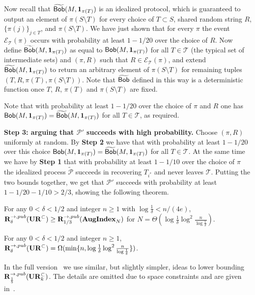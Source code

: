 Now recall that $\widetilde{\mathsf{Bob}}(M, \mathbf{1}_{\pi(T)})$ is an idealized protocol, which is guaranteed to output an element of $\pi(S\setminus T)$ for every choice of  $T\subset S$, shared random string $R$, $\{\pi(j)\}_{j\in T}$, and $\pi(S\setminus T)$. We have just shown that for every $\pi$ the event ${\mathcal E_{\mathcal T}(\pi)}$ occurs  with probability at least $1-1/20$ over the choice of $R$. Now define $\widetilde{\mathsf{Bob}}(M, \mathbf{1}_{\pi(T)})$ as equal to $\mathsf{Bob}(M, \mathbf{1}_{\pi(T)})$ for all $T\in \mathcal{T}$ (the typical set of intermediate sets) and $(\pi, R)$ such that $R\in {\mathcal E_{\mathcal T}(\pi)}$, and extend $\widetilde{\mathsf{Bob}}(M, \mathbf{1}_{\pi(T)})$ to return an arbitrary element of $\pi(S\setminus T)$ for remaining tuples $(T, R, \pi(T),  \pi(S\setminus T))$. Note that $\widetilde{\mathsf{Bob}}$ defined in this way is a deterministic function once $T$, $R$, $\pi(T)$ and $\pi(S\setminus T)$ are fixed. 

Note that with probability at least $1-1/20$ over the choice of $\pi$ and $R$ one has $\mathsf{Bob}(M, \mathbf{1}_{\pi(T)})=\widetilde{\mathsf{Bob}}(M, \mathbf{1}_{\pi(T)})$ for all $T\in \mathcal{T}$, as required.


{\bf Step 3: arguing that $\mathcal{P}'$ succeeds with high probability.}  Choose $(\pi, R)$ uniformly at random. By {\bf Step 2} we have that with probability at least $1-1/20$ over this choice 
$\mathsf{Bob}(M, \mathbf{1}_{\pi(T)})=\widetilde{\mathsf{Bob}}(M, \mathbf{1}_{\pi(T)})$ for all $T\in \mathcal{T}$. At the same time we have by {\bf Step 1} that with probability at least $1-1/10$ over the choice of $\pi$ the idealized process $\widetilde{\mathcal{P}}$ 
succeeds in recovering $T_{i^*}$ and never leaves $\mathcal{T}$. Putting the two bounds together, we get that $\mathcal{P}'$ succeeds with probability at least $1-1/20-1/10>2/3$, showing the following theorem.


\begin{theorem}
For any $0<\delta<1/2$ and integer $n\ge 1$ with $\log \frac 1{\delta} < n/(4e)$, $\mathbf{R}^{\rightarrow,pub}_\delta(\mathbf{UR}^\subset) \ge \mathbf{R}^{\rightarrow,pub}_{1/3}(\mathbf{AugIndex}_N)$ for $N = \Theta(\log\frac 1{\delta} \log^2 \frac n{\log \frac 1{\delta}})$.
\end{theorem}

\begin{corollary}
For any $0<\delta<1/2$ and integer $n\ge 1$, $\mathbf{R}^{\rightarrow,pub}_\delta(\mathbf{UR}^\subset) = \Omega(\min\{n, \log\frac 1{\delta} \log^2 \frac n{\log \frac 1{\delta}}\})$.
\end{corollary}


In the full version~\cite{KapralovNPWWY17} we use similar, but slightly simpler, ideas to lower bounding $\mathbf{R}^{\rightarrow,pub}_{\frac 15}(\mathbf{UR}_k^\subset)$. The details are omitted due to space constraints and are given in~\cite{KapralovNPWWY17}.
